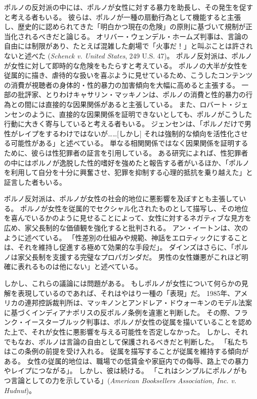 \documentclass[paper=a4,book,openany]{jlreq}
\newcommand{\ig}[1]{}           %
\begin{document}
ポルノの反対派の中には、ポルノが女性に対する暴力を助長し、その発生を促すと考える者もいる。
彼らは、ポルノが一種の扇動行為として機能すると主張し、歴史的に認められてきた「明白かつ現在の危険」の原則に基づいて規制が正当化されるべきだと論じる。
オリバー・ウェンデル・ホームズ判事は、言論の自由には制限があり、たとえば混雑した劇場で「火事だ！」と叫ぶことは許されないと述べた
(\emph{Schenck v. United States}, 249 U.S. 47)。
ポルノ反対派は、ポルノが女性に対して即時的な危険をもたらすと考えている。
ポルノの大半が女性を従属的に描き、虐待的な扱いを喜ぶように見せているため、こうしたコンテンツの消費が視聴者の身体的・性的暴力の加害傾向を大幅に高めると主張する。
一部の批評家、とりわけキャサリン・マッキノンは、ポルノの消費と性的暴力の行為との間には直接的な因果関係があると主張している\citep{mackinnon94:_pornog}。
また、ロバート・ジェンセンのように、直接的な因果関係を証明できないとしても、ポルノがこうした行動に大きく寄与していると考える者もいる。
ジェンセンは、「ポルノだけで男性がレイプをするわけではないが……[しかし] それは強制的な傾向を活性化させる可能性がある」と述べている\citep[p.103]{jensen07:gettingoff}。
単なる相関関係ではなく因果関係を証明するために、彼らは性犯罪者の証言を引用している。
ある研究によれば、性犯罪者の中にはポルノが逸脱した性的嗜好を強めたと報告する者がいるほか、「ポルノを利用して自分を十分に興奮させ、犯罪を抑制する心理的抵抗を乗り越えた」と証言した者もいる\citep[p.70]{marshall00:_revis_use_pornog_sexual_offen}。

ポルノ反対派は、ポルノが女性の社会的地位に悪影響を及ぼすとも主張している。
ポルノが女性を従属的でセクシャル化されたものとして描写し、その地位を喜んでいるかのように見せることによって、女性に対するネガティブな見方を広め、家父長制的な価値観を強化すると批判される\citep{hald13:_pornog_sexis_attit_among_heter}。
アン・イートンは、次のように述べている。
「性差別の仕組みや規範、神話をエロティックにすることは、それを維持し促進する極めて効果的な手段だ」\citep{eaton07:sensibleantiporn}。
ダインズはさらに、「ポルノは家父長制を支援する完璧なプロパガンダだ。
男性の女性嫌悪がこれほど明確に表れるものは他にない」と述べている\citep{bindel10:_truth_porn_indus}。

しかし、これらの議論には問題がある。
もしポルノが女性について何らかの見解を表現しているのであれば、それはやはり一種の「表現」だ。
1985年、アメリカの連邦控訴裁判所は、マッキノンとアンドレア・ドウォーキン\ig{Andrea Dworkin}のモデル法案に基づくインディアナポリスの反ポルノ条例を違憲と判断した。
その際、フランク・イースターブルック判事は、ポルノが女性の従属を描いていることを認めた上で、それが女性に悪影響を与える可能性を否定しなかった。
しかし、それでもなお、ポルノは言論の自由として保護されるべきだと判断した。
「私たちはこの条例の前提を受け入れる。
従属を描写することが従属を維持する傾向がある。
女性の従属的地位は、職場での低賃金や家庭内での侮辱、路上での暴力やレイプにつながる」。
しかし、彼は続ける。
「これはシンプルにポルノがもつ言論としての力を示している」(\emph{American Booksellers Association, Inc. v. Hudnut})。
\end{document}
